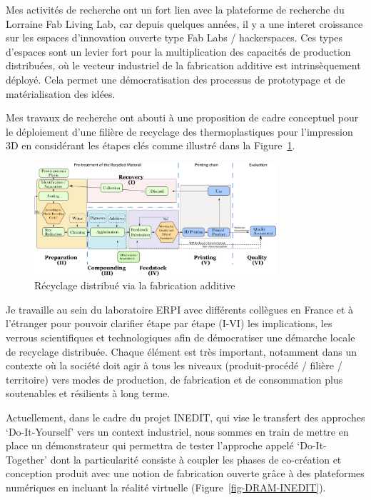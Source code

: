 \documentclass[
  11pt,
]{article}
\begin{document}
Mes activités de recherche ont un fort lien avec la plateforme de
recherche du Lorraine Fab Living Lab, car depuis quelques années, il y a
une interet croissance sur les espaces d'innovation ouverte type Fab
Labs / hackerspaces. Ces types d'espaces sont un levier fort pour la
multiplication des capacités de production distribuées, où le vecteur
industriel de la fabrication additive est intrinsèquement déployé. Cela
permet une démocratisation des processus de prototypage et de
matérialisation des idées.

Mes travaux de recherche ont abouti à une proposition de cadre
conceptuel pour le déploiement d'une filière de recyclage des
thermoplastiques pour l'impression 3D en considérant les étapes clés
comme illustré dans la Figure~\ref{fig-sdram}.

\begin{figure}[H]

{\centering \includegraphics[width=0.8\textwidth,height=\textheight]{Figures/DRAM-10.png}

}

\caption{\label{fig-sdram}Récyclage distribué via la fabrication
additive}

\end{figure}

Je travaille au sein du laboratoire ERPI avec différents collègues en
France et à l'étranger pour pouvoir clarifier étape par étape (I-VI) les
implications, les verrous scientifiques et technologiques afin de
démocratiser une démarche locale de recyclage distribuée. Chaque élément
est très important, notamment dans un contexte où la société doit agir à
tous les niveaux (produit-procédé / filière / territoire) vers modes de
production, de fabrication et de consommation plus soutenables et
résilients à long terme.

Actuellement, dans le cadre du projet INEDIT, qui vise le transfert des
approches `Do-It-Yourself' vers un context industriel, nous sommes en
train de mettre en place un démonstrateur qui permettra de tester
l'approche appelé `Do-It-Together' dont la particularité consiste à
coupler les phases de co-création et conception produit avec une notion
de fabrication ouverte grâce à des plateformes numériques en incluant la
réalité virtuelle (Figure~\ref{fig-DRAM-INEDIT}).
\end{document}

